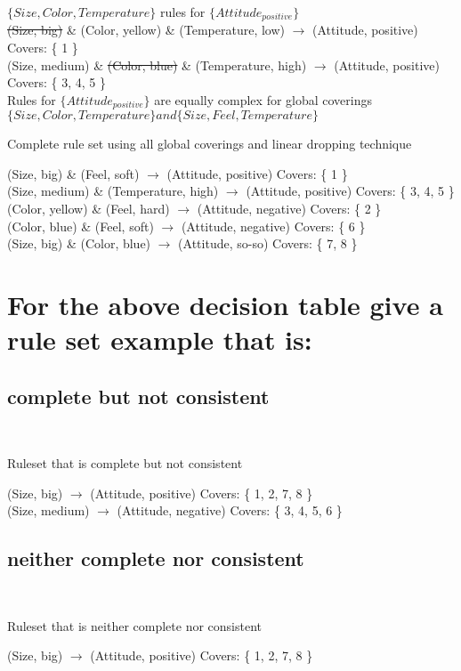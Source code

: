 \documentclass[10pt]{amsart}
\begin{document}
$ \{ Size, Color, Temperature \} $ rules for $ \{ Attitude_{positive} \} $\\
\sout{(Size, big)} \& (Color, yellow) \& (Temperature, low) $\rightarrow$ (Attitude, positive) \qquad Covers: \{ 1 \} \\
(Size, medium) \& \sout{(Color, blue)} \& (Temperature, high) $\rightarrow$ (Attitude, positive) \qquad Covers: \{ 3, 4, 5 \} \\

Rules for $ \{ Attitude_{positive} \} $ are equally complex for global coverings $\{ Size, Color, Temperature\} and \{ Size, Feel, Temperature \}$

\begin{center}Complete rule set using all global coverings and linear dropping technique\end{center}

(Size, big) \& (Feel, soft) $\rightarrow$ (Attitude, positive) \qquad Covers: \{ 1 \}\\
(Size, medium) \& (Temperature, high) $\rightarrow$ (Attitude, positive) \qquad Covers: \{ 3, 4, 5 \} \\
(Color, yellow) \& (Feel, hard) $\rightarrow$ (Attitude, negative) \qquad Covers: \{ 2 \}\\
(Color, blue) \& (Feel, soft) $\rightarrow$ (Attitude, negative) \qquad Covers: \{ 6 \}\\
(Size, big) \& (Color, blue) $\rightarrow$ (Attitude, so-so) \qquad Covers: \{ 7, 8 \}\\

\section{For the above decision table give a rule set example that is:}
\subsection{complete but not consistent}\hspace*{\fill} \\
\begin{center}Ruleset that is complete but not consistent\end{center}
(Size, big) $\rightarrow$ (Attitude, positive) \qquad Covers: \{ 1, 2, 7, 8 \}\\
(Size, medium) $\rightarrow$ (Attitude, negative) \qquad Covers: \{ 3, 4, 5, 6 \}\\

\subsection{neither complete nor consistent}\hspace*{\fill} \\
\begin{center}Ruleset that is neither complete nor consistent\end{center}
(Size, big) $\rightarrow$ (Attitude, positive) \qquad Covers: \{ 1, 2, 7, 8 \}\\
\end{document}
